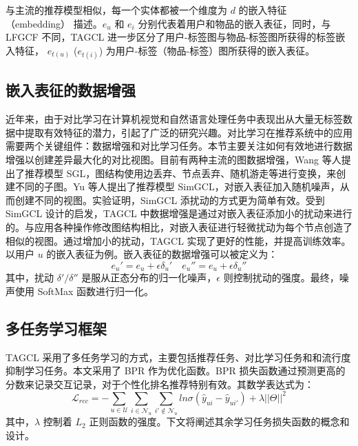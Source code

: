 与主流的推荐模型相似，每一个实体都被一个维度为 $d$ 的嵌入特征 （embedding） 描述。$e_u$ 和 $e_i$ 分别代表着用户和物品的嵌入表征，同时，与 LFGCF 不同，TAGCL 进一步区分了用户-标签图与物品-标签图所获得的标签嵌入特征， $e_{t(u)}$ ($e_{t(i)}$) 为用户-标签（物品-标签）图所获得的嵌入表征。

\subsection{嵌入表征的数据增强}
近年来，由于对比学习在计算机视觉和自然语言处理任务中表现出从大量无标签数据中提取有效特征的潜力，引起了广泛的研究兴趣\cite{chen_simclr_2020,gidaris_unsupervised_2018,devlin_bert_2019,gao_simcse_2021}。对比学习在推荐系统中的应用需要两个关键组件：数据增强和对比学习任务。本节主要关注如何有效地进行数据增强以创建差异最大化的对比视图。目前有两种主流的图数据增强，Wang 等人\cite{wu_self-supervised_2021}提出了推荐模型 SGL，图结构使用边丢弃、节点丢弃、随机游走等进行变换，来创建不同的子图。Yu 等人\cite{yu_simgcl_2022}提出了推荐模型 SimGCL，对嵌入表征加入随机噪声，从而创建不同的视图。实验证明，SimGCL 添扰动的方式更为简单有效。受到 SimGCL 设计的启发，TAGCL 中数据增强是通过对嵌入表征添加小的扰动来进行的。与应用各种操作修改图结构相比，对嵌入表征进行轻微扰动为每个节点创造了相似的视图。通过增加小的扰动，TAGCL 实现了更好的性能，并提高训练效率。以用户 $u$ 的嵌入表征为例。嵌入表征的数据增强可以被定义为：
\begin{equation}
    e_u' = e_u + \epsilon \delta_u' \quad e_u'' = e_u + \epsilon \delta_u'' 
\end{equation}
其中，扰动 $\delta'/\delta''$ 是服从正态分布的归一化噪声，$\epsilon$ 则控制扰动的强度。最终，噪声使用 SoftMax 函数进行归一化。

\subsection{多任务学习框架}
TAGCL 采用了多任务学习的方式，主要包括推荐任务、对比学习任务和和流行度抑制学习任务。本文采用了 BPR 作为优化函数。BPR 损失函数通过预测更高的分数来记录交互记录，对于个性化排名推荐特别有效。其数学表达式为：
\begin{equation}
    \mathcal{L}_{rec} = -\sum_{u \in \mathcal{U}}\sum_{i \in \mathcal{N}_u}\sum_{i' \notin \mathcal{N}_u} ln \sigma (\hat{y}_{ui} - \hat{y}_{ui'}) + \lambda||\Theta||^2
\end{equation}
其中，$\lambda$ 控制着 $L_2$ 正则函数的强度。下文将阐述其余学习任务损失函数的概念和设计。

